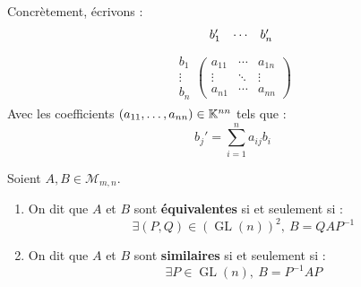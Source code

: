 \par \noindent Concrètement, écrivons : 
\begin{align*}
    \hspace{0.45cm}
    \begin{matrix}
        b_1' & \cdots & b_n' 
    \end{matrix}
\end{align*}
\vspace{-1.1cm}
\begin{align*}
    \begin{matrix}
        b_1 \\
        \vdots \\ 
        b_n
    \end{matrix}
    \begin{pmatrix}
        a_{11} & \cdots & a_{1n} \\
        \vdots & \ddots & \vdots \\ 
        a_{n1} & \cdots & a_{nn}
    \end{pmatrix}
\end{align*}
Avec les coefficients $(a_{11}, \ldots, a_{nn}) \in \mathbb{K}^{nn}$ tels que :
\[ b_j' = \sum_{i=1}^{n} a_{ij} b_i  \]

\begin{definition}
    Soient $A, B \in \mathcal{M}_{m,n}$.
    \begin{enumerate}
        \item On dit que $A$ et $B$ sont \textbf{équivalentes} si et seulement si : 
        \[ \exists (P, Q) \in (\operatorname{GL}(n))^2,\ B = Q A P^{-1} \]
        \item On dit que $A$ et $B$ sont \textbf{similaires} si et seulement si :
        \[ \exists P \in \operatorname{GL}(n),\ B = P^{-1} A P \]
    \end{enumerate}
\end{definition}

